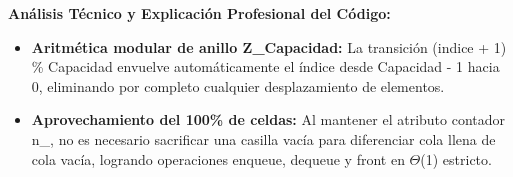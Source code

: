 \documentclass[11pt,letterpaper]{article}
\begin{document}
\noindent\textbf{\color{ipnguinda}Análisis Técnico y Explicación Profesional del Código:}\par\vspace{-2pt}
\begin{itemize}
\setlength{\itemsep}{2pt}\setlength{\parskip}{0pt}
  \item \textbf{Aritmética modular de anillo Z\_Capacidad: }La transición (indice + 1) \% Capacidad envuelve automáticamente el índice desde Capacidad - 1 hacia 0, eliminando por completo cualquier desplazamiento de elementos.
  \item \textbf{Aprovechamiento del 100\% de celdas: }Al mantener el atributo contador n\_, no es necesario sacrificar una casilla vacía para diferenciar cola llena de cola vacía, logrando operaciones enqueue, dequeue y front en $\Theta$(1) estricto.
\end{itemize}
\end{document}
